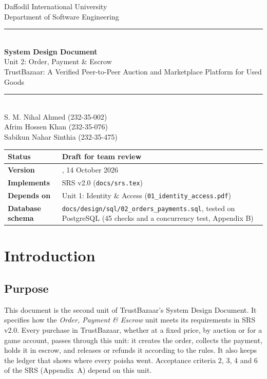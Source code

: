 \documentclass[11pt,a4paper]{article}
\begin{document}
\begin{titlepage}
\centering
\vspace*{1cm}
{\Large Daffodil International University}\\[0.2cm]
{\large Department of Software Engineering}\\[2cm]
\rule{\linewidth}{0.5pt}\\[0.4cm]
{\huge\bfseries System Design Document}\\[0.3cm]
{\LARGE Unit 2: Order, Payment \& Escrow}\\[0.3cm]
{\large TrustBazaar: A Verified Peer-to-Peer Auction and Marketplace Platform for Used Goods}\\[0.2cm]
\rule{\linewidth}{0.5pt}\\[1.6cm]
{\large S. M. Nihal Ahmed (232-35-002)\\[0.1cm] Afrim Hossen Khan (232-35-076)\\[0.1cm] Sabikun Nahar Sinthia (232-35-475)}\\[1.6cm]
\begin{tabular}{|l|>{\raggedright\arraybackslash}p{8cm}|}
\hline
\textbf{Status} & Draft for team review \\ \hline
\textbf{Version} & 0.1, 14 October 2026 \\ \hline
\textbf{Implements} & SRS v2.0 (\texttt{docs/srs.tex}) \\ \hline
\textbf{Depends on} & Unit 1: Identity \& Access (\texttt{01\_identity\_access.pdf}) \\ \hline
\textbf{Database schema} & \texttt{docs/design/sql/02\_orders\_payments.sql}, tested on PostgreSQL (45 checks and a concurrency test, Appendix B) \\ \hline
\end{tabular}
\vfill
\end{titlepage}
\tableofcontents
\newpage
\section{Introduction}

\subsection{Purpose}
This document is the second unit of TrustBazaar's System Design Document. It specifies how the \emph{Order, Payment \& Escrow} unit meets its requirements in SRS v2.0. Every purchase in TrustBazaar, whether at a fixed price, by auction or for a game account, passes through this unit: it creates the order, collects the payment, holds it in escrow, and releases or refunds it according to the rules. It also keeps the ledger that shows where every poisha went. Acceptance criteria 2, 3, 4 and 6 of the SRS (Appendix~A) depend on this unit.
\end{document}
